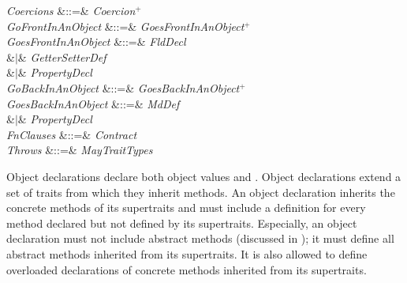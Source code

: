 \begin{Grammar}
\emph{Coercions} &::=& \emph{Coercion}$^+$\\

\emph{GoFrontInAnObject} &::=& \emph{GoesFrontInAnObject}$^+$\\

\emph{GoesFrontInAnObject}
&::=& \emph{FldDecl} \\
&$|$& \emph{GetterSetterDef} \\
&$|$& \emph{PropertyDecl} \\

\emph{GoBackInAnObject} &::=& \emph{GoesBackInAnObject}$^+$\\

\emph{GoesBackInAnObject}
&::=& \emph{MdDef} \\
&$|$& \emph{PropertyDecl} \\

\emph{FnClauses} &::=&  
\emph{Contract} \\

\emph{Throws} &::=&  \emph{MayTraitTypes}\\

\end{Grammar}

Object declarations declare both object values and \objecttypes.
Object declarations extend a
set of traits from which they inherit methods.
An object declaration inherits the
concrete methods of its supertraits and must include a definition for every
method declared but not defined by its supertraits.
Especially, an object declaration must not include abstract methods
(discussed in );
it must define all abstract methods inherited from its supertraits.
It is also allowed to define overloaded declarations of concrete methods
inherited from its supertraits.



